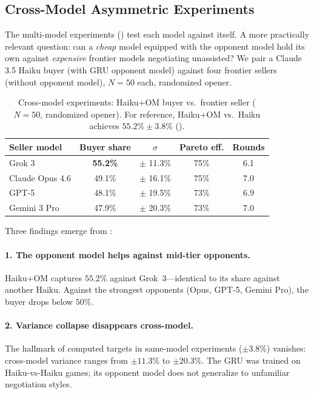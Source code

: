 \documentclass[11pt,a4paper]{article}
\begin{document}
\subsection{Cross-Model Asymmetric Experiments}
\label{sec:crossmodel_asym}

The multi-model experiments () test each model against itself. A more practically relevant question: can a \emph{cheap} model equipped with the opponent model hold its own against \emph{expensive} frontier models negotiating unassisted? We pair a Claude 3.5 Haiku buyer (with GRU opponent model) against four frontier sellers (without opponent model), $N = 50$ each, randomized opener.

\begin{table}[t]
\centering
\caption{Cross-model experiments: Haiku+OM buyer vs.\ frontier seller ($N = 50$, randomized opener). For reference, Haiku+OM vs.\ Haiku achieves $55.2\% \pm 3.8\%$ ().}
\label{tab:crossmodel}
\begin{tabular}{lcccc}
\toprule
Seller model & Buyer share & $\sigma$ & Pareto eff. & Rounds \\
\midrule
Grok 3 & \textbf{55.2\%} & $\pm$ 11.3\% & 75\% & 6.1 \\
Claude Opus 4.6 & 49.1\% & $\pm$ 16.1\% & 75\% & 7.0 \\
GPT-5 & 48.1\% & $\pm$ 19.5\% & 73\% & 6.9 \\
Gemini 3 Pro & 47.9\% & $\pm$ 20.3\% & 73\% & 7.0 \\
\bottomrule
\end{tabular}
\end{table}

Three findings emerge from :

\paragraph{1. The opponent model helps against mid-tier opponents.} Haiku+OM captures $55.2\%$ against Grok~3---identical to its share against another Haiku. Against the strongest opponents (Opus, GPT-5, Gemini Pro), the buyer drops below $50\%$.

\paragraph{2. Variance collapse disappears cross-model.} The hallmark of computed targets in same-model experiments ($\pm 3.8\%$) vanishes: cross-model variance ranges from $\pm 11.3\%$ to $\pm 20.3\%$. The GRU was trained on Haiku-vs-Haiku games; its opponent model does not generalize to unfamiliar negotiation styles.
\end{document}
